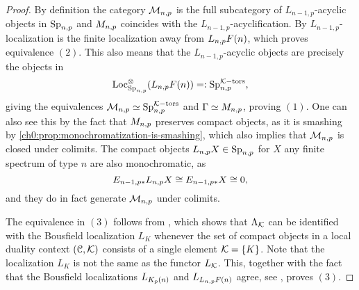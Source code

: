 \begin{proof}
    By definition the category $\mathcal{M}_{n,p}$ is the full subcategory of $L_{n-1,p}$-acyclic objects in $\mathrm{Sp}_{n,p}$ and $M_{n,p}$ coincides with the $L_{n-1,p}$-acyclification. By \cite[6.10]{hovey-strickland_99} $L_{n-1,p}$-localization is the finite localization away from $L_{n,p} F(n)$, which proves equivalence $(2)$. This also means that the $L_{n-1,p}$-acyclic objects are precisely the objects in 
    \[\operatorname{Loc}^\otimes_{\mathrm{Sp}_{n,p}}(L_{n,p} F(n))=:\mathrm{Sp}_{n,p}^{\mathcal{K}-\mathrm{tors}},\]
    giving the equivalences $\mathcal{M}_{n,p} \simeq \mathrm{Sp}_{n,p}^{\mathcal{K}-\mathrm{tors}}$ and $\Gamma \simeq M_{n,p}$, proving $(1)$. One can also see this by the fact that $M_{n,p}$ preserves compact objects, as it is smashing by \cref{ch0:prop:monochromatization-is-smashing}, which also implies that $\mathcal{M}_{n,p}$ is closed under colimits. The compact objects $L_{n,p} X\in \mathrm{Sp}_{n,p}$ for $X$ any finite spectrum of type $n$ are also monochromatic, as 
    \[E_{n-1,p *} L_{n,p} X \cong E_{n-1,p *}X\cong 0,\]
    and they do in fact generate $\mathcal{M}_{n,p}$ under colimits. 



    
    

    The equivalence in $(3)$ follows from \cite[2.34]{barthel-heard-valenzuela_2018}, which shows that $\Lambda_{\mathcal{K}}$ can be identified with the Bousfield localization $L_K$ whenever the set of compact objects in a local duality context $(\EuScript{C}, \mathcal{K})$ consists of a single element $\mathcal{K}=\{K\}$. Note that the localization $L_K$ is not the same as the functor $L_{\mathcal{K}}$. This, together with the fact that the Bousfield localizations $L_{K_p(n)}$ and $L_{L_{n,p} F(n)}$ agree, see \cite[7.1]{hovey-strickland_99}, proves $(3)$. 
\end{proof}

